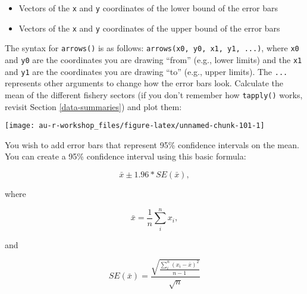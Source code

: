 \documentclass[]{book}
\newenvironment{Shaded}{\begin{snugshade}}{\end{snugshade}}
\newcommand{\KeywordTok}[1]{\textcolor[rgb]{0.13,0.29,0.53}{\textbf{#1}}}
\newcommand{\StringTok}[1]{\textcolor[rgb]{0.31,0.60,0.02}{#1}}
\newcommand{\OperatorTok}[1]{\textcolor[rgb]{0.81,0.36,0.00}{\textbf{#1}}}
\newcommand{\NormalTok}[1]{#1}
\providecommand{\tightlist}{%
  \setlength{\itemsep}{0pt}\setlength{\parskip}{0pt}}
\theoremstyle{definition}
\theoremstyle{definition}
\theoremstyle{definition}
\theoremstyle{remark}
\begin{document}
\begin{itemize}
\tightlist
\item
  Vectors of the \texttt{x} and \texttt{y} coordinates of the lower
  bound of the error bars
\item
  Vectors of the \texttt{x} and \texttt{y} coordinates of the upper
  bound of the error bars
\end{itemize}

The syntax for \texttt{arrows()} is as follows:
\texttt{arrows(x0,\ y0,\ x1,\ y1,\ ...)}, where \texttt{x0} and
\texttt{y0} are the coordinates you are drawing ``from'' (e.g., lower
limits) and the \texttt{x1} and \texttt{y1} are the coordinates you are
drawing ``to'' (e.g., upper limits). The \texttt{...} represents other
arguments to change how the error bars look. Calculate the mean of the
different fishery sectors (if you don't remember how \texttt{tapply()}
works, revisit Section \ref{data-summaries}) and plot them:

\begin{Shaded}
\end{Shaded}

\begin{center}\texttt{[image: au-r-workshop\_files/figure-latex/unnamed-chunk-101-1]} \end{center}

You wish to add error bars that represent 95\% confidence intervals on
the mean. You can create a 95\% confidence interval using this basic
formula:

\begin{equation}
  \bar{x} \pm 1.96 * SE(\bar{x}),
\label{eq:ci}
\end{equation}

where

\begin{equation}
  \bar{x}=\frac{1}{n}\sum_i^n{x_i},
\label{eq:ci-mean}
\end{equation}

and

\begin{equation}
  SE(\bar{x})=\frac{\sqrt{\frac{\sum_i^n{(x_i - \bar{x})^2}}{n-1}}}{\sqrt{n}}
\label{eq:ci-se}
\end{equation}
\end{document}
